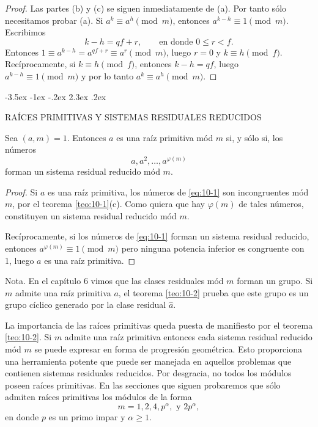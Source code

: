 \documentclass[12pt,a4paper]{book}
\makeatletter
\renewcommand\section{\@startsection{section}{1}{\z@}%
  {-3.5ex \@plus -1ex \@minus -.2ex}%
  {2.3ex \@plus .2ex}%
  {\normalfont\Large\bfseries\raggedright}}
\makeatother
\begin{document}
    \begin{proof}
        Las partes (b) y (c) se siguen inmediatamente de (a). Por tanto sólo necesitamos
        probar (a). Si $a^{k}\equiv a^{h}\pmod{m}$, entonces $a^{k-h}\equiv1\pmod{m}$.
        Escribimos
        \begin{equation*}
            k-h=qf+r,\qquad\text{en donde }0\leq r<f.
        \end{equation*}
        Entonces $1\equiv a^{k-h}=a^{qf+r}\equiv a^{r}\pmod{m}$, luego $r=0$ y
        $k\equiv h\pmod{f}$. Recíprocamente, si $k\equiv h\pmod{f}$, entonces $k-h=qf$,
        luego $a^{k-h}\equiv1\pmod{m}$ y por lo tanto $a^{k}\equiv a^{h}\pmod{m}$.
    \end{proof}

    \section{RAÍCES PRIMITIVAS Y SISTEMAS RESIDUALES REDUCIDOS}
    \begin{teorema}\label{teo:10-2}
        Sea $(a,m)=1$. Entonces $a$ es una raíz primitiva mód $m$ si, y sólo si, los números
        \begin{equation}\label{eq:10-1}
            a,a^{2},\dots,a^{\varphi(m)}
        \end{equation}
        forman un sistema residual reducido mód $m$.
    \end{teorema}

    \begin{proof}
        Si $a$ es una raíz primitiva, los números de \eqref{eq:10-1} son incongruentes mód
        $m$, por el teorema \ref{teo:10-1}(c). Como quiera que hay $\varphi(m)$ de tales
        números, constituyen un sistema residual reducido mód $m$.

        Recíprocamente, si los números de \eqref{eq:10-1} forman un sistema residual
        reducido, entonces $a^{\varphi(m)}\equiv1\pmod{m}$ pero ninguna potencia inferior es
        congruente con 1, luego $a$ es una raíz primitiva.
    \end{proof}

    Nota. En el capítulo 6 vimos que las clases residuales mód $m$ forman un grupo. Si $m$
    admite una raíz primitiva $a$, el teorema \ref{teo:10-2} prueba que este grupo es un
    grupo cíclico generado por la clase residual $\hat{a}$.

    La importancia de las raíces primitivas queda puesta de manifiesto por el teorema
    \ref{teo:10-2}. Si $m$ admite una raíz primitiva entonces cada sistema residual reducido
    mód $m$ se puede expresar en forma de progresión geométrica. Esto proporciona una
    herramienta potente que puede ser manejada en aquellos problemas que contienen sistemas
    residuales reducidos. Por desgracia, no todos los módulos poseen raíces primitivas. En
    las secciones que siguen probaremos que sólo admiten raíces primitivas los módulos de la
    forma
    \begin{equation*}
        m=1,2,4,p^{\alpha},\text{ y }2p^{\alpha},
    \end{equation*}
    en donde $p$ es un primo impar y $\alpha\geq1$.
\end{document}
